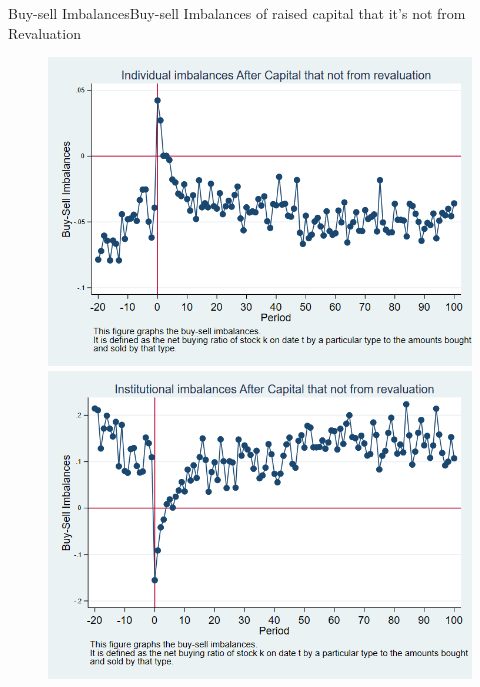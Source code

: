 \documentclass{beamer}
\begin{document}
\begin{frame}{Buy-sell Imbalances}{Buy-sell Imbalances of raised capital that it's not from Revaluation}
\begin{figure}
\centering
\includegraphics[width=0.45\linewidth]{IndImb_NoRevaluation}
\includegraphics[width=0.45\linewidth]{InsImb_NoRevaluation}
\label{fig:indimbnorevaluation}
\end{figure}
\end{frame}
\end{document}
